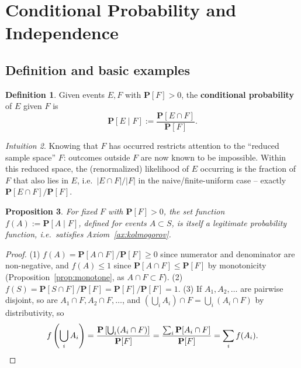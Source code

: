 \documentclass[11pt]{article}
\theoremstyle{definition}
\newtheorem{definition}{Definition}[section]
\theoremstyle{plain}
\newtheorem{proposition}[definition]{Proposition}
\theoremstyle{remark}
\newtheorem{intuition}[definition]{Intuition}
\begin{document}
\newpage
\section{Conditional Probability and Independence}

\subsection{Definition and basic examples}

\begin{definition}
Given events $E,F$ with $\mathbf{P}[F]>0$, the \textbf{conditional probability} of $E$ given $F$
is
\[
\mathbf{P}[E\mid F] := \frac{\mathbf{P}[E\cap F]}{\mathbf{P}[F]}.
\]
\end{definition}

\begin{intuition}
Knowing that $F$ has occurred restricts attention to the ``reduced sample space'' $F$: outcomes
outside $F$ are now known to be impossible. Within this reduced space, the (renormalized)
likelihood of $E$ occurring is the fraction of $F$ that also lies in $E$, i.e.\
$|E\cap F|/|F|$ in the naive/finite-uniform case -- exactly $\mathbf{P}[E\cap F]/\mathbf{P}[F]$.
\end{intuition}

\begin{proposition}
For fixed $F$ with $\mathbf{P}[F]>0$, the set function $f(A) := \mathbf{P}[A\mid F]$, defined for
events $A \subset S$, is itself a legitimate probability function, i.e.\ satisfies
Axiom~\ref{ax:kolmogorov}.
\end{proposition}
\begin{proof}
(1) $f(A) = \mathbf{P}[A\cap F]/\mathbf{P}[F] \ge 0$ since numerator and denominator are
non-negative, and $f(A) \le 1$ since $\mathbf{P}[A\cap F]\le \mathbf{P}[F]$ by monotonicity
(Proposition~\ref{prop:monotone}, as $A\cap F \subset F$).
(2) $f(S) = \mathbf{P}[S\cap F]/\mathbf{P}[F] = \mathbf{P}[F]/\mathbf{P}[F]=1$.
(3) If $A_1,A_2,\dots$ are pairwise disjoint, so are $A_1\cap F, A_2\cap F,\dots$, and
$\left(\bigcup_i A_i\right)\cap F = \bigcup_i (A_i \cap F)$ by distributivity, so
\[
f\left(\bigcup_i A_i\right) = \frac{\mathbf{P}\left[\bigcup_i(A_i\cap F)\right]}{\mathbf{P}[F]}
= \frac{\sum_i \mathbf{P}[A_i\cap F]}{\mathbf{P}[F]} = \sum_i f(A_i). \qedhere
\]
\end{proof}
\end{document}
